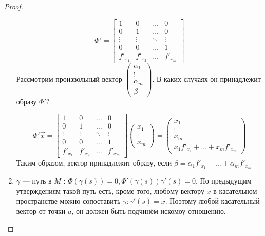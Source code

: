 \begin{proof}
\begin{enumerate}
              $$\Phi' = \begin{bmatrix}
                      1        & 0        & \ldots & 0        \\
                      0        & 1        & \ldots & 0        \\
                      \vdots   & \vdots   & \ddots & \vdots   \\
                      0        & 0        & \ldots & 1        \\
                      f'_{x_1} & f'_{x_2} & \ldots & f'_{x_m}
                  \end{bmatrix}$$
              Рассмотрим произвольный вектор $\begin{pmatrix}
                      \alpha_1 \\
                      \vdots   \\
                      \alpha_m \\
                      \beta
                  \end{pmatrix}$. В каких случаях он принадлежит образу $\Phi'$?

              $$\Phi' \vec x = \begin{bmatrix}
                      1        & 0        & \ldots & 0        \\
                      0        & 1        & \ldots & 0        \\
                      \vdots   & \vdots   & \ddots & \vdots   \\
                      0        & 0        & \ldots & 1        \\
                      f'_{x_1} & f'_{x_2} & \ldots & f'_{x_m}
                  \end{bmatrix} \begin{pmatrix}
                      x_1    \\
                      \vdots \\
                      x_m
                  \end{pmatrix} = \begin{pmatrix}
                      x_1    \\
                      \vdots \\
                      x_m    \\
                      x_1 f'_{x_1} + \ldots + x_m f'_{x_m}
                  \end{pmatrix}$$
              Таким образом, вектор принадлежит образу, если $\beta = \alpha_1 f'_{x_1} + \ldots + \alpha_m f'_{x_m}$
        \item $\gamma$ --- путь в $M$ : $\Phi(\gamma(s)) = 0, \Phi'(\gamma(s))\gamma'(s) = 0$. По предыдущим утверждениям такой путь есть, кроме того, любому вектору $x$ в касательном пространстве можно сопоставить $\gamma : \gamma'(s) = x$. Поэтому любой касательный вектор от точки $a$, он должен быть подчинём искомоу отношению.


\end{enumerate}
\end{proof}
